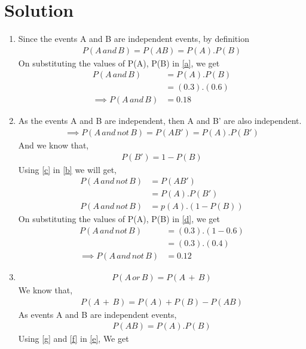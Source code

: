 \documentclass[journal,12pt,twocolumn]{IEEEtran}
\begin{document}
\section{Solution}
\begin{enumerate}[label={\roman*)}]
\item
Since the events A and B are independent events, by definition
\begin{align}
    P(A\, and\, B) = P(AB) = P(A).P(B)\label{a}
\end{align}
On substituting the values of P(A), P(B) in \eqref{a}, we get
\begin{align}
    P(A\, and\, B) &= P(A).P(B)\\
    &= (0.3).(0.6)\\
    \implies P(A\, and\, B)&=0.18
\end{align}
\item
As the events A and B are independent, then A and B' are also independent.
\begin{align}   
\implies P(A\, and\,not\, B) =P(AB') = P(A).P(B')\label{b}
\end{align}
And we know that,
\begin{align}
    P(B')=1-P(B)\label{c}
\end{align}
Using \eqref{c} in \eqref{b} we will get,
\begin{align}
    P(A\, and\,not\, B) &=P(AB') \\
    &= P(A).P(B')\\
    P(A\, and\,not\, B)&= p(A).(1-P(B))\label{d}
\end{align}
On substituting the values of P(A), P(B) in \eqref{d}, we get
\begin{align}
    P(A\, and\, not\, B) &= (0.3).(1-0.6)\\
    &= (0.3).(0.4)\\
    \implies P(A\, and\, not\, B)&= 0.12
\end{align}
\item
\begin{align}
    P(A\,or\,B) =P(A\,+\,B)\label{e}
\end{align}
We know that,
\begin{align}
    P(A\, +\, B) = P(A) + P(B) -P(AB)\label{f}
\end{align}
As events A and B are independent events,
\begin{align}
    P(AB)=P(A).P(B)\label{g}
\end{align}
Using \eqref{g} and \eqref{f} in \eqref{e}, We get
\begin{align}

\end{align}
\end{enumerate}
\end{document}
